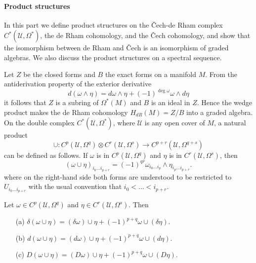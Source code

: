 \paragraph{Product structures}
In this part we define product structures on the \v{C}ech-de Rham complex $C^*(\mathcal{U},\Omega^*)$, the de Rham cohomology, and the \v{C}ech cohomology, and show that 
the isomorphism between de Rham and \v{C}ech is an isomorphism of graded algebras. We also discuss the product structures on a spectral sequence.\par
Let $Z$ be the closed forms and $B$ the exact forms on a manifold $M$. From the antiderivation property of the exterior derivative
\[d(\omega\wedge\eta)=d\omega\wedge\eta+(-1)^{\deg\omega}\omega\wedge d\eta\]
it follows that $Z$ is a subring of $\Omega^*(M)$ and $B$ is an ideal in $Z$. Hence the wedge product makes the de Rham cohomology $H_{dR}(M)=Z/B$ into a graded algebra.
On the double complex $C^*(\mathcal{U},\Omega^*)$, where $\mathcal{U}$ is any open cover of $M$, a natural product
\[\cup:C^p(\mathcal{U},\Omega^q)\otimes C^r(\mathcal{U},\Omega^s)\to C^{p+r}(\mathcal{U},\Omega^{q+s})\]
can be defined as follows. If $\omega$ is in $C^p(\mathcal{U},\Omega^q)$ and $\eta$ is in $C^r(\mathcal{U},\Omega^s)$, then
\[(\omega\cup\eta)_{i_0\dots i_{p+r}}=(-1)^{qr}\omega_{i_0\dots i_p}\wedge\eta_{i_{p}\dots i_{p+r}}.\]
where on the right-hand side both forms are understood to be restricted to $U_{i_0\dots i_{p+r}}$ with the usual convention that $i_0<\dots<i_{p+r}$.
\begin{proposition}\label{Cech de Rham cup prod prop}
Let $\omega\in C^p(\mathcal{U},\Omega^q)$ and $\eta\in C^r(\mathcal{U},\Omega^s)$. Then
\begin{itemize}
\item[(a)] $\delta(\omega\cup\eta)=(\delta\omega)\cup\eta+(-1)^{p+q}\omega\cup(\delta\eta)$.
\item[(b)] $d(\omega\cup\eta)=(d\omega)\cup\eta+(-1)^{p+q}\omega\cup(d\eta)$.
\item[(c)] $D(\omega\cup\eta)=(D\omega)\cup\eta+(-1)^{p+q}\omega\cup(D\eta)$.
\end{itemize}
\end{proposition}
